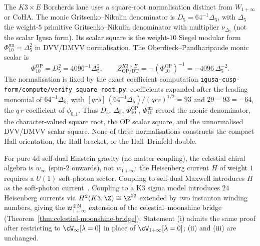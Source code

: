 \begin{remark}
\label{rem:igusa-square-normalisations}
The $K3\times E$ Borcherds lane uses a square-root normalisation
distinct from $W_{1+\infty}$ or CoHA. The monic
Gritsenko--Nikulin denominator is $D_5=64^{-1}\Delta_5$, with
$\Delta_5$ the weight-$5$ primitive Gritsenko--Nikulin denominator
with multiplier $\nu_{\Delta_5}$ (not the scalar Igusa form). Its
scalar square is the weight-$10$ Siegel modular form
$\Phi_{10}^{\mathrm{un}}=\Delta_5^2$ in DVV/DMVV normalisation.
The Oberdieck--Pandharipande monic scalar is
\[
 \Phi_{10}^{\mathrm{OP}}=D_5^2=4096^{-1}\Delta_5^2,
 \qquad
 Z_{\mathrm{OP/DT}}^{K3\times E}
 =-(\Phi_{10}^{\mathrm{OP}})^{-1}
 =-4096\,\Delta_5^{-2}.
\]
The normalisation is fixed by the exact coefficient computation
\texttt{igusa-cusp-form/compute/verify\_square\_root.py}:
coefficients expanded after the leading monomial of
$64^{-1}\Delta_5$, with
$[qrs]\,(64^{-1}\Delta_5)/(qrs)^{1/2}=93$ and $29-93=-64$, the
$q\,r$ coefficient of $\phi_{0,1}$. Thus $D_5$, $\Delta_5$,
$\Phi_{10}^{\mathrm{OP}}$, $\Phi_{10}^{\mathrm{un}}$ record the
monic denominator, the character-valued square root, the OP
scalar square, and the unnormalised DVV/DMVV scalar square. None
of these normalisations constructs the compact Hall orientation,
the Hall bracket, or the Hall--Drinfeld double.
\end{remark}

\begin{remark}
\label{rem:scope-of-one-plus}
For pure 4d self-dual Einstein gravity (no matter coupling), the
celestial chiral algebra is $w_\infty$ (spin-$2$ onwards), not
$w_{1+\infty}$: the Heisenberg current $H$ of weight $1$ requires
a $U(1)$ soft-photon sector. Coupling to self-dual Maxwell
introduces $H$ as the soft-photon
current~\cite{DonnayPuhmStrominger18,StromingerWInfinityCelestial}.
Coupling to a
K3 sigma model introduces $24$ Heisenberg currents via
$H^2(K3, \Z) \cong \Z^{22}$ extended by two instanton winding
numbers, giving the
$\mathfrak{w}_{1+\infty}^{\oplus 24}$ extension of the
celestial--moonshine bridge
(Theorem~\ref{thm:celestial-moonshine-bridge}). Statement (i)
admits the same proof after restricting to
$\cW_\infty[\lambda=0]$ in place of $\cW_{1+\infty}[\lambda=0]$;
(ii) and (iii) are unchanged.
\end{remark}

